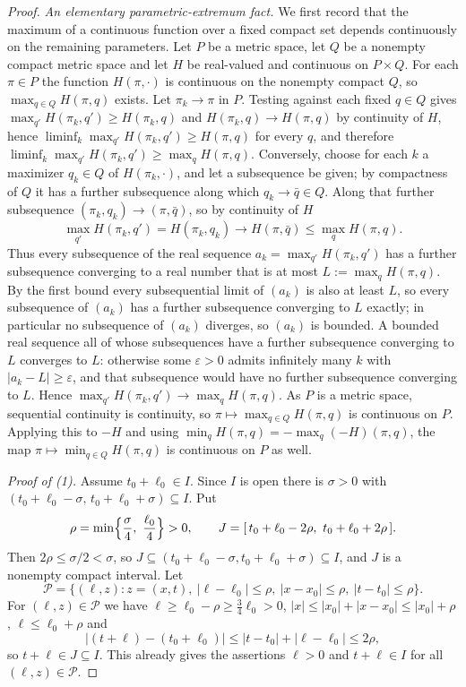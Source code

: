 \begin{proof}
\emph{An elementary parametric-extremum fact.}
We first record that the maximum of a continuous function over a fixed compact
set depends continuously on the remaining parameters. Let $P$ be a metric space,
let $Q$ be a nonempty compact metric space and let $H$ be real-valued and
continuous on $P\times Q$. For each $\pi\in P$ the function $H(\pi,\cdot)$ is
continuous on the nonempty compact $Q$, so $\max_{q\in Q}H(\pi,q)$ exists. Let
$\pi_k\to\pi$ in $P$. Testing against each fixed $q\in Q$ gives
$\max_{q'}H(\pi_k,q')\ge H(\pi_k,q)$ and $H(\pi_k,q)\to H(\pi,q)$ by continuity
of $H$, hence $\liminf_k\max_{q'}H(\pi_k,q')\ge H(\pi,q)$ for every $q$, and
therefore $\liminf_k\max_{q'}H(\pi_k,q')\ge\max_qH(\pi,q)$. Conversely, choose
for each $k$ a maximizer $q_k\in Q$ of $H(\pi_k,\cdot)$, and let a subsequence be
given; by compactness of $Q$ it has a further subsequence along which
$q_k\to\bar q\in Q$. Along that further subsequence
$(\pi_k,q_k)\to(\pi,\bar q)$, so by continuity of $H$
\[
  \max_{q'}H(\pi_k,q')=H(\pi_k,q_k)\to H(\pi,\bar q)\le\max_qH(\pi,q).
\]
Thus every subsequence of the real sequence $a_k=\max_{q'}H(\pi_k,q')$ has a
further subsequence converging to a real number that is at most
$L:=\max_qH(\pi,q)$. By the first bound every subsequential limit of $(a_k)$ is
also at least $L$, so every subsequence of $(a_k)$ has a further subsequence
converging to $L$ exactly; in particular no subsequence of $(a_k)$ diverges, so
$(a_k)$ is bounded. A bounded real sequence all of whose subsequences have a
further subsequence converging to $L$ converges to $L$: otherwise some
$\varepsilon>0$ admits infinitely many $k$ with $|a_k-L|\ge\varepsilon$, and
that subsequence would have no further subsequence converging to $L$. Hence
$\max_{q'}H(\pi_k,q')\to\max_qH(\pi,q)$. As $P$ is a metric space, sequential
continuity is continuity, so $\pi\mapsto\max_{q\in Q}H(\pi,q)$ is continuous on
$P$. Applying this to $-H$ and using $\min_qH(\pi,q)=-\max_q(-H)(\pi,q)$, the map
$\pi\mapsto\min_{q\in Q}H(\pi,q)$ is continuous on $P$ as well.

\emph{Proof of (1).}
Assume $t_0+\ell_0\in I$. Since $I$ is open there is $\sigma>0$ with
$(t_0+\ell_0-\sigma,\,t_0+\ell_0+\sigma)\subseteq I$. Put
\[
  \rho=\min\Bigl\{\frac\sigma4,\ \frac{\ell_0}4\Bigr\}>0,
  \qquad
  J=[\,t_0+\ell_0-2\rho,\ t_0+\ell_0+2\rho\,].
\]
Then $2\rho\le\sigma/2<\sigma$, so $J\subseteq
(t_0+\ell_0-\sigma,t_0+\ell_0+\sigma)\subseteq I$, and $J$ is a nonempty compact
interval. Let
\[
  \mathcal P=\bigl\{(\ell,z):z=(x,t),\ |\ell-\ell_0|\le\rho,\
    |x-x_0|\le\rho,\ |t-t_0|\le\rho\bigr\}.
\]
For $(\ell,z)\in\mathcal P$ we have $\ell\ge\ell_0-\rho\ge\tfrac34\ell_0>0$,
$|x|\le|x_0|+|x-x_0|\le|x_0|+\rho$, $\ell\le\ell_0+\rho$ and
\[
  |(t+\ell)-(t_0+\ell_0)|\le|t-t_0|+|\ell-\ell_0|\le2\rho,
\]
so $t+\ell\in J\subseteq I$. This already gives the assertions $\ell>0$ and
$t+\ell\in I$ for all $(\ell,z)\in\mathcal P$.


\end{proof}
